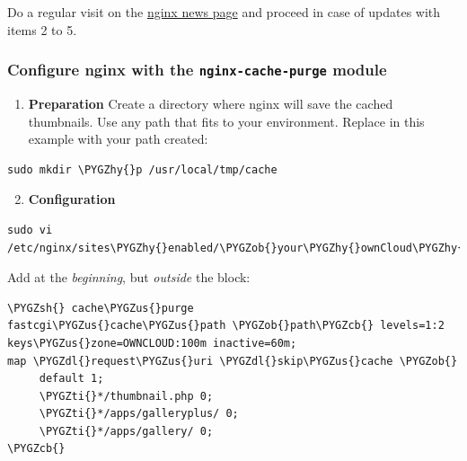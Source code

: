 \documentclass[letterpaper,10pt,english]{sphinxmanual}
\def\PYGZus{\char`\_}
\def\PYGZob{\char`\{}
\def\PYGZcb{\char`\}}
\def\PYGZsh{\char`\#}
\def\PYGZdl{\char`\$}
\def\PYGZhy{\char`\-}
\def\PYGZti{\char`\~}
\begin{document}
Do a regular visit on the \href{http://nginx.org}{nginx news page} and proceed
in case of updates with items 2 to 5.


\subsubsection{Configure nginx with the \texttt{nginx-cache-purge} module}
\label{installation/nginx_examples:configure-nginx-with-the-nginx-cache-purge-module}\begin{enumerate}
\item {} 
\textbf{Preparation}
Create a directory where nginx will save the cached thumbnails. Use any
path that fits to your environment. Replace  in this example with
your path created:

\end{enumerate}

\begin{Verbatim}[commandchars=\\\{\}]
sudo mkdir \PYGZhy{}p /usr/local/tmp/cache
\end{Verbatim}
\begin{enumerate}
\setcounter{enumi}{1}
\item {} 
\textbf{Configuration}

\end{enumerate}

\begin{Verbatim}[commandchars=\\\{\}]
sudo vi /etc/nginx/sites\PYGZhy{}enabled/\PYGZob{}your\PYGZhy{}ownCloud\PYGZhy{}nginx\PYGZhy{}config\PYGZhy{}file\PYGZcb{}
\end{Verbatim}

Add at the \emph{beginning}, but \emph{outside} the  block:

\begin{Verbatim}[commandchars=\\\{\}]
\PYGZsh{} cache\PYGZus{}purge
fastcgi\PYGZus{}cache\PYGZus{}path \PYGZob{}path\PYGZcb{} levels=1:2 keys\PYGZus{}zone=OWNCLOUD:100m inactive=60m;
map \PYGZdl{}request\PYGZus{}uri \PYGZdl{}skip\PYGZus{}cache \PYGZob{}
     default 1;
     \PYGZti{}*/thumbnail.php 0;
     \PYGZti{}*/apps/galleryplus/ 0;
     \PYGZti{}*/apps/gallery/ 0;
\PYGZcb{}
\end{Verbatim}
\end{document}
